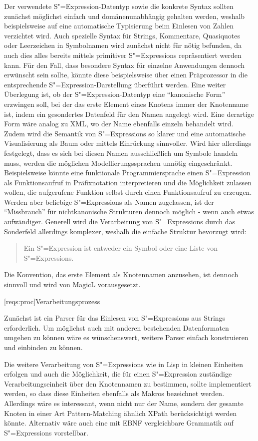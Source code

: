 \documentclass[11pt, a4paper, bibgerm]{book}
\newcommand\lsection{}
\newcommand{\sexp}{S"=Expression}
\newcommand{\sexps}{S"=Expressions}
\begin{document}
Der verwendete \sexp{}-Datentyp sowie die konkrete Syntax sollten
zunächst möglichst einfach und domänenunabhängig gehalten werden,
weshalb beispielsweise auf eine automatische Typisierung beim Einlesen
von Zahlen verzichtet wird. Auch spezielle Syntax für Strings,
Kommentare, Quasiquotes oder Leerzeichen in Symbolnamen wird zunächst
nicht für nötig befunden, da auch dies alles bereits mittels primitiver
\sexps{} repräsentiert werden kann. Für den Fall, dass besondere Syntax
für einzelne Anwendungen dennoch erwünscht sein sollte, könnte diese
beispielsweise über einen Präprozessor in die entsprechende
\sexp{}-Darstellung überführt werden. Eine weiter Überlegung ist, ob der
\sexp{}-Datentyp eine "`kanonische Form"' erzwingen soll, bei der das
erste Element eines Knotens immer der Knotenname ist, indem ein
gesondertes Datenfeld für den Namen angelegt wird. Eine derartige Form
wäre analog zu XML, wo der Name ebenfalls einzeln behandelt wird. Zudem
wird die Semantik von \sexps{} so klarer und eine automatische
Visualisierung als Baum oder mittels Einrückung sinnvoller.  Wird hier
allerdings festgelegt, dass es sich bei diesen Namen ausschließlich um
Symbole handeln muss, werden die möglichen Modellierungssprachen unnötig
eingeschränkt. Beispielsweise könnte eine funktionale Programmiersprache
einen \sexp{} als Funktionsaufruf in Präfixnotation interpretieren und
die Möglichkeit zulassen wollen, die aufgerufene Funktion selbst durch
einen Funktionsaufruf zu erzeugen. Werden aber beliebige \sexps{} als
Namen zugelassen, ist der "`Missbrauch"' für nichtkanonische Strukturen
dennoch möglich - wenn auch etwas aufwändiger. Generell wird die
Verarbeitung von \sexps{} durch das Sonderfeld allerdings komplexer,
weshalb die einfache Struktur bevorzugt wird:
\begin{quote}
  Ein \sexp{} ist entweder ein Symbol oder eine Liste von \sexps{}.
\end{quote}
Die Konvention, das erste Element als Knotennamen anzusehen, ist dennoch
sinnvoll und wird von MagicL vorausgesetzt.

\lsection[reqs:proc]{Verarbeitungsprozess}

Zunächst ist ein Parser für das Einlesen von \sexps{} aus Strings
erforderlich. Um möglichst auch mit anderen bestehenden Datenformaten
umgehen zu können wäre es wünschenswert, weitere Parser einfach
konstruieren und einbinden zu können.

Die weitere Verarbeitung von \sexps{} wie in Lisp in kleinen Einheiten
erfolgen und auch die Möglichkeit, die für einen \sexp{} zuständige
Verarbeitungseinheit über den Knotennamen zu bestimmen, sollte
implementiert werden, so dass diese Einheiten ebenfalls als Makros
bezeichnet werden. Allerdings wäre es interessant, wenn nicht nur der
Name, sondern der gesamte Knoten in einer Art Pattern-Matching ähnlich
XPath berücksichtigt werden könnte. Alternativ wäre auch eine mit EBNF
vergleichbare Grammatik auf \sexps{} vorstellbar.
\end{document}
